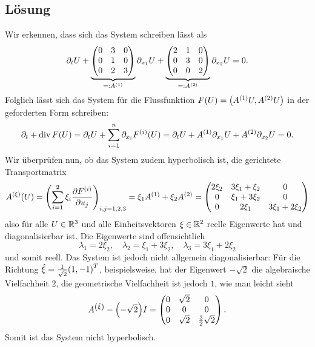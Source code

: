 \documentclass{exercise}
\begin{document}
    \subsection*{Lösung}
    Wir erkennen, dass sich das System schreiben lässt als
    \[
        \partial_t U +  \underbrace{\begin{pmatrix}
            0 & 3 & 0\\
            0 & 1 & 0\\
            0 & 2 & 3
        \end{pmatrix}}_{=: A^{\parentheses*{1}}}\partial_{x_1}U + \underbrace{\begin{pmatrix}
            2 & 1 & 0\\
            0 & 3 & 0\\
            0 & 0 & 2
        \end{pmatrix}}_{=: A^{\parentheses*{2}}}\partial_{x_2}U = 0.
    \]
    Folglich lässt sich das System für die Flussfunktion \(F\parentheses*{U} = \parentheses*{A^{\parentheses*{1}}U, A^{\parentheses*{2}}U}\) in der geforderten Form schreiben:
    \[
        \partial_t + \vecdiv F\parentheses*{U} = \partial_t U + \sum_{i = 1}^n \partial_{x_i}F^{\parentheses*{i}}\parentheses*{U} = \partial_t U + A^{\parentheses*{1}}\partial_{x_1}U + A^{\parentheses*{2}}\partial_{x_2}U = 0.
    \]
    Wir überprüfen nun, ob das System zudem hyperbolisch ist, die gerichtete Transportmatrix
    \[
        A^{\parentheses*{\xi}}\parentheses*{U} = \parentheses*{\sum_{i = 1}^2 \xi_i\frac{\partial F^{\parentheses*{i}}}{\partial u_j}}_{i, j = 1, 2, 3} = \xi_1 A^{\parentheses*{1}} + \xi_2 A^{\parentheses*{2}} = \begin{pmatrix}
            2\xi_2 & 3\xi_1 + \xi_2 & 0\\
            0 & \xi_1 + 3\xi_2 & 0\\
            0 & 2\xi_1 & 3\xi_1 + 2\xi_2
        \end{pmatrix}
    \]
    also für alle \(U \in \R^3\) und alle Einheitsvektoren \(\xi \in \R^2\) reelle Eigenwerte hat und diagonalisierbar ist.
    Die Eigenwerte sind offensichtlich
    \[
        \lambda_1 = 2\xi_2, \quad \lambda_2 = \xi_1 + 3\xi_2, \quad \lambda_3 = 3\xi_1 + 2\xi_2
    \]
    und somit reell.
    Das System ist jedoch nicht allgemein diagonalisierbar: Für die Richtung \(\hat{\xi} = \frac{1}{\sqrt{2}}\parentheses*{1, -1}^T\), beispielsweise, hat der Eigenwert \(-\sqrt{2}\) die algebraische Vielfachheit \(2\), die geometrische Vielfachheit ist jedoch \(1\), wie man leicht sieht
    \[
        A^{\parentheses*{\hat{\xi}}} - \parentheses*{-\sqrt{2}}I = \begin{pmatrix}
            0 & \sqrt{2} & 0\\
            0 & 0 & 0\\
            0 & \sqrt{2} & \frac{3}{2}\sqrt{2}
        \end{pmatrix}.
    \]
    Somit ist das System nicht hyperbolisch.
\end{document}
